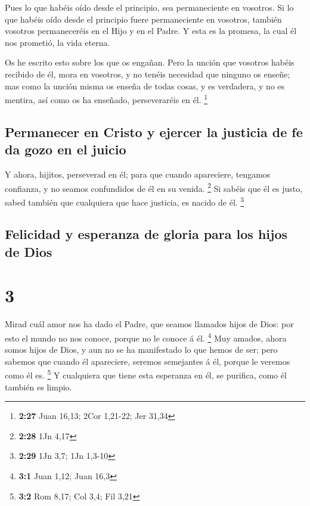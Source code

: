  Pues lo que habéis oído desde el principio, sea
permaneciente en vosotros. Si lo que habéis oído desde el principio
fuere permaneciente en vosotros, también vosotros permaneceréis en el
Hijo y en el Padre.  Y esta es la promesa, la cual él nos
prometió, la vida eterna.

 Os he escrito esto sobre los que os engañan.
 Pero la unción que vosotros habéis recibido de él, mora
en vosotros, y no tenéis necesidad que ninguno os enseñe; mas como la
unción misma os enseña de todas cosas, y es verdadera, y no es mentira,
así como os ha enseñado, perseveraréis en él. \footnote{\textbf{2:27}
  Juan 16,13; 2Cor 1,21-22; Jer 31,34}

\hypertarget{permanecer-en-cristo-y-ejercer-la-justicia-de-fe-da-gozo-en-el-juicio}{%
\subsection{Permanecer en Cristo y ejercer la justicia de fe da gozo en
el
juicio}\label{permanecer-en-cristo-y-ejercer-la-justicia-de-fe-da-gozo-en-el-juicio}}

 Y ahora, hijitos, perseverad en él; para que cuando
apareciere, tengamos confianza, y no seamos confundidos de él en su
venida. \footnote{\textbf{2:28} 1Jn 4,17}  Si sabéis que
él es justo, sabed también que cualquiera que hace justicia, es nacido
de él. \footnote{\textbf{2:29} 1Jn 3,7; 1Jn 1,3-10}

\hypertarget{felicidad-y-esperanza-de-gloria-para-los-hijos-de-dios}{%
\subsection{Felicidad y esperanza de gloria para los hijos de
Dios}\label{felicidad-y-esperanza-de-gloria-para-los-hijos-de-dios}}

\hypertarget{section-2}{%
\section{3}\label{section-2}}

 Mirad cuál amor nos ha dado el Padre, que seamos llamados
hijos de Dios: por esto el mundo no nos conoce, porque no le conoce á
él. \footnote{\textbf{3:1} Juan 1,12; Juan 16,3}  Muy
amados, ahora somos hijos de Dios, y aun no se ha manifestado lo que
hemos de ser; pero sabemos que cuando él apareciere, seremos semejantes
á él, porque le veremos como él es. \footnote{\textbf{3:2} Rom 8,17; Col
  3,4; Fil 3,21}  Y cualquiera que tiene esta esperanza en
él, se purifica, como él también es limpio.

